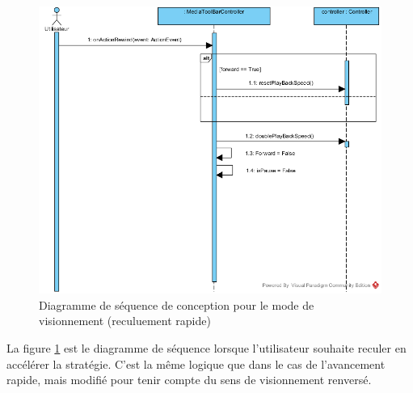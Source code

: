 \begin{figure}[htpb]
    \centering
    \includegraphics[scale=0.3]{fig/dsc_rewind.png}
    \caption{Diagramme de séquence de conception pour le mode de visionnement (reculuement rapide)}
    \label{fig:dsc_view_rewind}
\end{figure}

La figure \ref{fig:dsc_view_rewind} est le diagramme de séquence lorsque l'utilisateur souhaite reculer en accélérer la stratégie.
C'est la même logique que dans le cas de l'avancement rapide, mais modifié pour tenir compte du sens de visionnement renversé.
